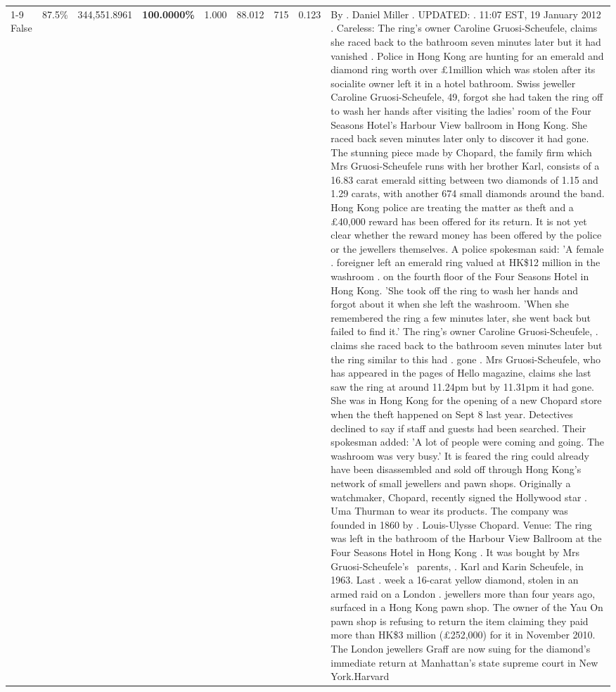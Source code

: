 \begin{table}[H]
\begin{tabular}{lllrlllll}
\cline{1-9} \cline{2-9}
False & 87.5\% & 344,551.8961 & \bfseries \color{red} 100.0000\% & 1.000 & 88.012 & 715 & 0.123 & By . Daniel Miller . UPDATED: . 11:07 EST, 19 January 2012 . Careless: The ring's owner Caroline Gruosi-Scheufele, claims she raced back to the bathroom seven minutes later but it had vanished . Police in Hong Kong are hunting for an emerald and diamond ring worth over £1million which was stolen after its socialite owner left it in a hotel bathroom. Swiss jeweller Caroline Gruosi-Scheufele, 49, forgot she had taken the ring off to wash her hands after visiting the ladies' room of the Four Seasons Hotel's Harbour View ballroom in Hong Kong. She raced back seven minutes later only to discover it had gone. The stunning piece made by Chopard, the family firm which Mrs Gruosi-Scheufele runs with her brother Karl, consists of a 16.83 carat emerald sitting between two diamonds of 1.15 and 1.29 carats, with another 674 small diamonds around the band. Hong Kong police are treating the matter as theft and a £40,000 reward has been offered for its return. It is not yet clear whether the reward money has been offered by the police or the jewellers themselves. A police spokesman said: 'A female . foreigner left an emerald ring valued at HK\$12 million in the washroom . on the fourth floor of the Four Seasons Hotel in Hong Kong. 'She took off the ring to wash her hands and forgot about it when she left the washroom. 'When she remembered the ring a few minutes later, she went back but failed to find it.' The ring's owner Caroline Gruosi-Scheufele, . claims she raced back to the bathroom seven minutes later but the ring similar to this had . gone . Mrs Gruosi-Scheufele, who has appeared in the pages of Hello magazine, claims she last saw the ring at around 11.24pm but by 11.31pm it had gone. She was in Hong Kong for the opening of a new Chopard store when the theft happened on Sept 8 last year. Detectives declined to say if staff and guests had been searched. Their spokesman added: 'A lot of people were coming and going. The washroom was very busy.' It is feared the ring could already have been disassembled and sold off through Hong Kong's network of small jewellers and pawn shops. Originally a watchmaker, Chopard, recently signed the Hollywood star . Uma Thurman to wear its products. The company was founded in 1860 by . Louis-Ulysse Chopard. Venue: The ring was left in the bathroom of the Harbour View Ballroom at the Four Seasons Hotel in Hong Kong . It was bought by Mrs Gruosi-Scheufele's  parents, . Karl and Karin Scheufele, in 1963. Last . week a 16-carat yellow diamond, stolen in an armed raid on a London . jewellers more than four years ago, surfaced in a Hong Kong pawn shop. The owner of the Yau On pawn shop is refusing to return the item claiming they paid more than HK\$3 million (£252,000) for it in November 2010. The London jewellers Graff are now suing for the diamond’s immediate return at Manhattan’s state supreme court in New York.Harvard \\

\end{tabular}
\end{table}
